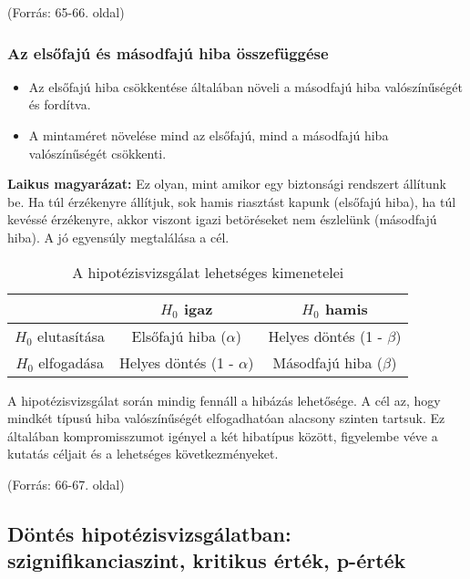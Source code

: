 \documentclass[a4paper,12pt]{article}
\begin{document}
    (Forrás: 65-66. oldal)

    \subsubsection{Az elsőfajú és másodfajú hiba összefüggése}

    \begin{itemize}
        \item Az elsőfajú hiba csökkentése általában növeli a másodfajú hiba valószínűségét és fordítva.
        \item A mintaméret növelése mind az elsőfajú, mind a másodfajú hiba valószínűségét csökkenti.
    \end{itemize}

    \textbf{Laikus magyarázat:}
    Ez olyan, mint amikor egy biztonsági rendszert állítunk be. Ha túl érzékenyre állítjuk, sok hamis riasztást kapunk (elsőfajú hiba), ha túl kevéssé érzékenyre, akkor viszont igazi betöréseket nem észlelünk (másodfajú hiba). A jó egyensúly megtalálása a cél.

    \begin{table}
        \centering
        \begin{tabular}{|c|c|c|}
            \hline
            & $H_0$ igaz                   & $H_0$ hamis                 \\
            \hline
            $H_0$ elutasítása & Elsőfajú hiba ($\alpha$)     & Helyes döntés (1 - $\beta$) \\
            \hline
            $H_0$ elfogadása  & Helyes döntés (1 - $\alpha$) & Másodfajú hiba ($\beta$)    \\
            \hline
        \end{tabular}
        \caption{A hipotézisvizsgálat lehetséges kimenetelei}
    \end{table}

    A hipotézisvizsgálat során mindig fennáll a hibázás lehetősége. A cél az, hogy mindkét típusú hiba valószínűségét elfogadhatóan alacsony szinten tartsuk. Ez általában kompromisszumot igényel a két hibatípus között, figyelembe véve a kutatás céljait és a lehetséges következményeket.

    (Forrás: 66-67. oldal)

    \subsection{Döntés hipotézisvizsgálatban: szignifikanciaszint, kritikus érték, p-érték}
\end{document}
